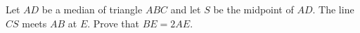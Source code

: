 Let $AD$ be a median of triangle $ABC$ and let $S$ be the midpoint of $AD$. The line $CS$ meets $AB$ at $E$. Prove that $BE=2AE$.
